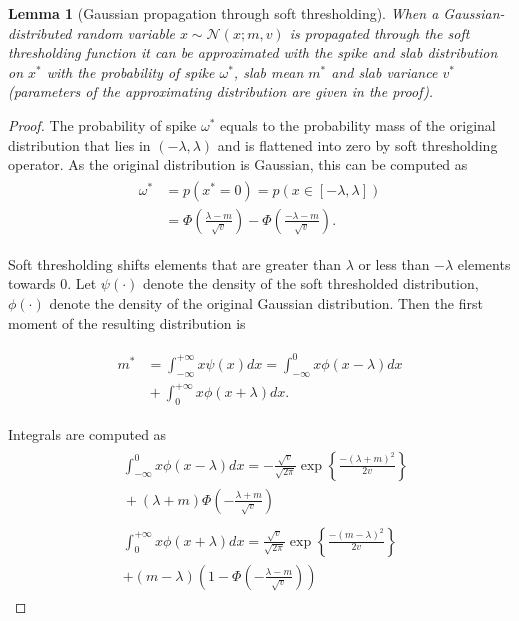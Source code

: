 \documentclass[letterpaper]{article}
\newtheorem{lemma}{Lemma}
\begin{document}
\begin{lemma}[Gaussian propagation through soft thresholding]
\label{thm:soft_thresholding}
When a Gaussian-distributed random variable $x \sim \mathcal{N}(x; m, v)$ is propagated through the soft thresholding function it can be approximated with the spike and slab distribution on $x^*$ with the probability of spike $\omega^*$, slab mean $m^*$ and slab variance $v^*$ (parameters of the approximating distribution are given in the proof).
\end{lemma}
\begin{proof}

The probability of spike $\omega^*$ equals to the probability mass of the original distribution that lies in $(-\lambda, \lambda)$  and is flattened into zero by soft thresholding operator. As the original distribution is Gaussian, this can be computed as 
\begin{align}
\begin{split}
\omega^* &= p(x^*=0) = p(x \in [-\lambda, \lambda]) \\
&= \Phi\left(\frac{\lambda-m}{\sqrt{v}}\right) - \Phi\left(\frac{-\lambda-m}{\sqrt{v}}\right). 
\end{split}
\end{align}

Soft thresholding shifts elements that are greater than $\lambda$  or less than $-\lambda$ elements towards 0. Let $\psi(\cdot)$ denote the density of the soft thresholded distribution, $\phi(\cdot)$ denote the density of the original Gaussian distribution. Then the first moment of the resulting distribution is 

\begin{align}
\begin{split}
m^* &= \int_{-\infty}^{+\infty}x\psi(x)dx= \int_{-\infty}^{0}x\phi(x-\lambda)dx \\
&{} + \int_{0}^{+\infty}x\phi(x+\lambda)dx.
\end{split}
\end{align}

Integrals are computed as
\begin{align}
\begin{split}
&\int_{-\infty}^{0}x\phi(x-\lambda)dx = -\frac{\sqrt{v}}{\sqrt{2\pi}} \exp\left\{\frac{-(\lambda+m)^2}{2v}\right\} \\
&{} + (\lambda+m)\Phi\left(-\frac{\lambda+m}{\sqrt{v}}\right)
\end{split}\\
\begin{split}
&\int_{0}^{+\infty}x\phi(x+\lambda)dx = \frac{\sqrt{v}}{\sqrt{2\pi}} \exp\left\{\frac{-(m - \lambda)^2}{2v}\right\}\\
& + (m - \lambda)\left(1 - \Phi\left(-\frac{\lambda-m}{\sqrt{v}}\right)\right)
\end{split}
\end{align}


\end{proof}
\end{document}
